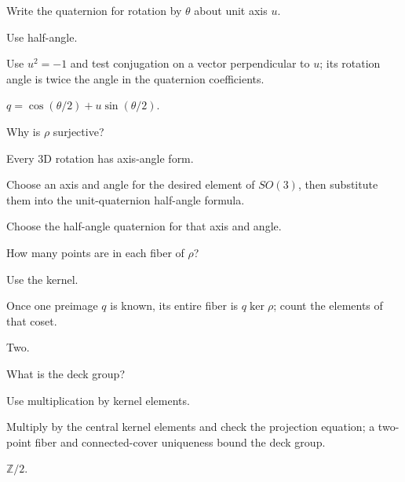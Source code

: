 \begin{exercise}\label{exr:viii13-10}
Write the quaternion for rotation by \(\theta\) about unit axis \(u\).
\end{exercise}
\begin{hint}
Use half-angle.

Use \(u^2=-1\) and test conjugation on a vector perpendicular to \(u\); its rotation angle is twice the angle in the quaternion coefficients.
\end{hint}
\begin{solution}
\(q=\cos(\theta/2)+u\sin(\theta/2)\).
\end{solution}

\begin{exercise}\label{exr:viii13-11}
Why is \(\rho\) surjective?
\end{exercise}
\begin{hint}
Every 3D rotation has axis-angle form.

Choose an axis and angle for the desired element of \(SO(3)\), then substitute them into the unit-quaternion half-angle formula.
\end{hint}
\begin{solution}
Choose the half-angle quaternion for that axis and angle.
\end{solution}

\begin{exercise}\label{exr:viii13-12}
How many points are in each fiber of \(\rho\)?
\end{exercise}
\begin{hint}
Use the kernel.

Once one preimage \(q\) is known, its entire fiber is \(q\ker\rho\); count the elements of that coset.
\end{hint}
\begin{solution}
Two.
\end{solution}

\begin{exercise}\label{exr:viii13-13}
What is the deck group?
\end{exercise}
\begin{hint}
Use multiplication by kernel elements.

Multiply by the central kernel elements and check the projection equation; a two-point fiber and connected-cover uniqueness bound the deck group.
\end{hint}
\begin{solution}
\(\mathbb Z/2\).
\end{solution}

